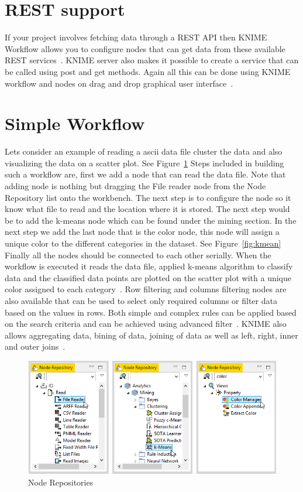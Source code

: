\section{REST support}

If your project involves fetching data through a REST API then KNIME
Workflow allows you to configure nodes that can get data from these
available REST services~\cite{hid-sp18-517-knimeapi}.  KNIME server
also makes it possible to create a service that can be called using
post and get methods.  Again all this can be done using KNIME workflow
and nodes on drag and drop graphical user
interface~\cite{hid-sp18-517-knimerest}.

\section{Simple Workflow}
Lets consider an example of reading a ascii data file cluster the data
and also visualizing the data on a scatter plot. See
Figure~\ref{fig:noderep} Steps included in building such a workflow
are, first we add a node that can read the data file.  Note that
adding node is nothing but dragging the File reader node from the Node
Repository list onto the workbench. The next step is to configure the
node so it know what file to read and the location where it is stored.
The next step would be to add the k-means node which can be found
under the mining section. In the next step we add the last node that
is the color node, this node will assign a unique color to the
different categories in the dataset. See Figure~\ref{fig:kmean}
Finally all the nodes should be connected to each other serially. When
the workflow is executed it reads the data file, applied k-means
algorithm to classify data and the classified data points are plotted
on the scatter plot with a unique color assigned to each
category~\cite{hid-sp18-517-wf}.  Row filtering and columns filtering
nodes are also available that can be used to select only required
columns or filter data based on the values in rows. Both simple and
complex rules can be applied based on the search criteria and can be
achieved using advanced filter~\cite{hid-sp18-517-filters}.  KNIME
also allows aggregating data, bining of data, joining of data as well
as left, right, inner and outer joins~\cite{hid-sp18-517-join}.

\begin{figure}[!ht]
	\centering\includegraphics[width=\columnwidth]{../images/node_repositories.png}
	\caption{Node Repositories~\cite{hid-sp18-517-wf}}
 	\label{fig:noderep}
\end{figure}

